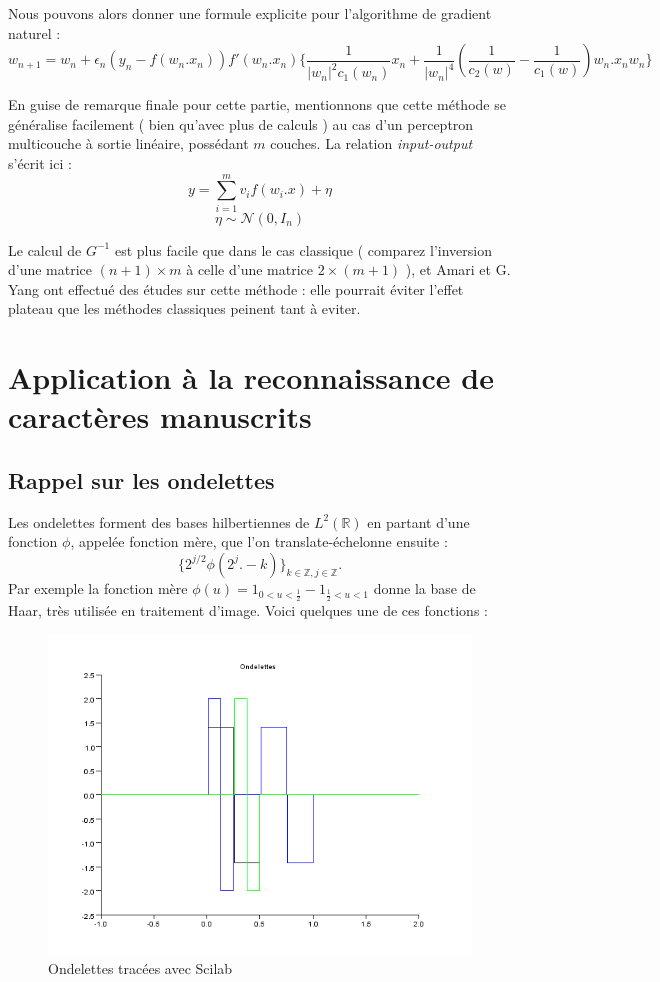 \documentclass{article}
\newcommand{\Z}{\mathbb Z}
\newcommand{\R}{\mathbb R}
\begin{document}
Nous pouvons alors donner une formule explicite pour l'algorithme de gradient naturel :
\[w_{n+1}=w_n + \epsilon_n(y_n-f(w_n.x_n))f'(w_n.x_n)
	\{ \frac{1}{|w_n|^2c_1(w_n)}x_n+\frac{1}{|w_n|^4}( \frac{1}{c_2(w)}-\frac{1}{c_1(w)}) w_n.x_n w_n\}\]

En guise de remarque finale pour cette partie, mentionnons que cette méthode se généralise facilement ( bien qu'avec plus de calculs ) au cas d'un perceptron multicouche à sortie linéaire, possédant $m$ couches. 
La relation \textit{input-output} s'écrit ici :
\[y=\sum_{i=1}^m v_i f(w_i.x)+\eta\]
\[\eta \sim \mathcal N(0,I_n)\]

Le calcul de $G^{-1}$ est plus facile que dans le cas classique ( comparez l'inversion d'une matrice $(n+1)\times m$ à celle d'une matrice $2 \times (m+1)$ ), et Amari et G. Yang ont effectué des études sur cette méthode : elle pourrait éviter l'effet plateau que les méthodes classiques peinent tant à eviter.

\section{Application à la reconnaissance de caractères manuscrits}

\subsection{Rappel sur les ondelettes}
Les ondelettes forment des bases hilbertiennes de $L^2(\R)$ en partant d'une fonction $\phi$, appelée fonction mère, que l'on translate-échelonne ensuite : 
\[\{2^{j/2}\phi(2^j . -k)\}_{k\in \Z, j \in \Z}.\]
Par exemple la fonction mère $\phi(u)=1_{0<u<\frac{1}{2}}-1_{\frac{1}{2}<u<1}$ donne la base de Haar, très utilisée en traitement d'image. Voici quelques une de ces fonctions :
\begin{figure}[h]\centering
\includegraphics[scale=0.4]{Ondelettes.png}
\caption{Ondelettes tracées avec Scilab}
\label{fig:Ondelettes}
\end{figure}
\end{document}
